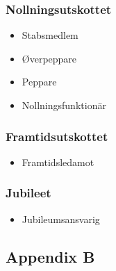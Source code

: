 \documentclass{dsekkallelse}
\begin{document}
\begin{multicols}{2}
\subsubsection{Nollningsutskottet}
\begin{itemize}
    \item Stabsmedlem
    \item Øverpeppare
    \item Peppare
    \item Nollningsfunktionär
\end{itemize}

\subsubsection{Framtidsutskottet}
\begin{itemize}
    \item Framtidsledamot
\end{itemize}

\subsubsection{Jubileet}
\begin{itemize}
    \item Jubileumsansvarig
\end{itemize}
\end{multicols}

\pagebreak
\subsection{Appendix B}
\end{document}
